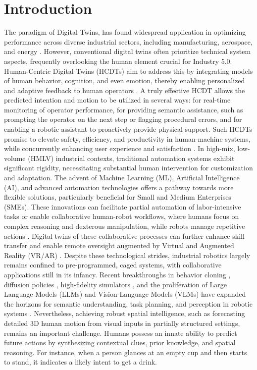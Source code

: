 \documentclass[biomimetics,article,submit,pdftex,moreauthors]{Definitions/mdpi}
\begin{document}
\section{Introduction}
The paradigm of Digital Twins, %
has found widespread application in optimizing performance across diverse industrial sectors, including manufacturing, aerospace, and energy \citep{Andronas2021, Polini2020}.
However, conventional digital twins often prioritize technical system aspects, frequently overlooking the human element crucial for Industry 5.0.
Human-Centric Digital Twins (HCDTs) aim to address this by integrating models of human behavior, cognition, and even emotion, thereby enabling personalized and adaptive feedback to human operators \citep{Usman}. A truly effective HCDT allows the predicted intention and motion to be utilized in several ways: for real-time monitoring of operator performance, for providing semantic assistance, such as prompting the operator on the next step or flagging procedural errors, and for enabling a robotic assistant to proactively provide physical support.
Such HCDTs promise to elevate safety, efficiency, and productivity in human-machine systems, while concurrently enhancing user experience and satisfaction \citep{Umbrico2022}.
In high-mix, low-volume (HMLV) industrial contexts, traditional automation systems exhibit significant rigidity, necessitating substantial human intervention for customization and adaptation.
The advent of Machine Learning (ML), Artificial Intelligence (AI), and advanced automation technologies offers a pathway towards more flexible solutions, particularly beneficial for Small and Medium Enterprises (SMEs).
These innovations can facilitate partial automation of labor-intensive tasks or enable collaborative human-robot workflows, where humans focus on complex reasoning and dexterous manipulation, while robots manage repetitive actions \citep{Cotta2023, Sirintuna2024}.
Digital twins of these collaborative processes can further enhance skill transfer and enable remote oversight augmented by Virtual and Augmented Reality (VR/AR) \citep{Nezhad2020, Laughlin2020}.
Despite these technological strides, industrial robotics largely remains confined to pre-programmed, caged systems, with collaborative applications still in its infancy.
Recent breakthroughs in behavior cloning \citep{Mandlekar2021}, diffusion policies \citep{Chi2023}, high-fidelity simulators \citep{orbitsurgical, Liu2023}, and the proliferation of Large Language Models (LLMs) \citep{Wei2022, Fan2024} and Vision-Language Models (VLMs) \citep{li2024llava} have expanded the horizons for semantic understanding, task planning, and perception in robotic systems \citep{Singh2023, Ahn2022}.
Nevertheless, achieving robust spatial intelligence, such as forecasting detailed 3D human motion from visual inputs in partially structured settings, remains an important challenge.
Humans possess an innate ability to predict future actions by synthesizing contextual clues, prior knowledge, and spatial reasoning.
For instance, when a person glances at an empty cup and then starts to stand, it indicates a likely intent to get a drink.
\end{document}
